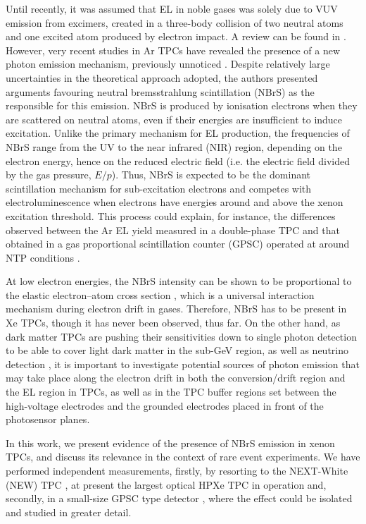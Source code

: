 \documentclass[%
 reprint,
superscriptaddress,
 amsmath,amssymb,
 aps,
]{revtex4-2}
\begin{document}
Until recently, it was assumed that EL in noble gases was solely due to VUV emission from excimers, created in a three-body collision of two neutral atoms and one excited atom produced by electron impact. A review can be found in \cite{33}. However, very recent studies in Ar TPCs have revealed the presence of a new photon emission mechanism, previously unnoticed \cite{34,35,36}. Despite relatively large uncertainties in the theoretical approach adopted, the authors presented arguments favouring neutral bremsstrahlung scintillation (NBrS) as the responsible for this emission. NBrS is produced by ionisation electrons when they are scattered on neutral atoms, even if their energies are insufficient to induce excitation. Unlike the primary mechanism for EL production, the frequencies of NBrS range from the UV to the near infrared (NIR) region, depending on the electron energy, hence on the reduced electric field (i.e. the electric field divided by the gas pressure,  $E/p$). Thus, NBrS is expected to be the dominant scintillation mechanism for sub-excitation electrons and competes with electroluminescence when electrons have energies around and above the xenon excitation threshold. This process could explain, for instance, the differences observed between the Ar EL yield measured in a double-phase TPC \cite{34,35} and that obtained in a gas proportional scintillation counter (GPSC) operated at around NTP conditions \cite{37}. 

At low electron energies, the NBrS intensity can be shown to be proportional to the elastic electron–atom cross section \cite{34}, which is a universal interaction mechanism during electron drift in gases. Therefore, NBrS has to be present in Xe TPCs, though it has never been observed, thus far. On the other hand, as dark matter TPCs are pushing their sensitivities down to single photon detection to be able to cover light dark matter in the sub-GeV region, as well as neutrino detection \cite{12,13,40}, it is important to investigate potential sources of photon emission that may take place along the electron drift in both the conversion/drift region and the EL region in TPCs, as well as in the TPC buffer regions set between the high-voltage electrodes and the grounded electrodes placed in front of the photosensor planes.

In this work, we present evidence of the presence of NBrS emission in xenon TPCs, and discuss its relevance in the context of rare event experiments. We have performed independent measurements, firstly, by resorting to the NEXT-White (NEW) TPC \cite{41}, at present the largest optical HPXe TPC in operation and, secondly, in a small-size GPSC type detector \cite{42,44}, where the effect could be isolated and studied in greater detail.
\end{document}
